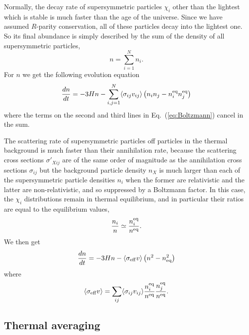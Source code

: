 Normally, the decay rate of supersymmetric particles $\chi_i$ other
than the lightest which is stable is much faster than the age of the
universe. Since we have assumed $R$-parity conservation, all of these
particles decay into the lightest one. So its final abundance is
simply described by the sum of the density of all supersymmetric
particles,
\begin{equation}
  n= \sum_{i=1}^N n_{i}.
\end{equation}
For $n$ we get the following evolution equation
\begin{equation}
  \frac{dn}{dt} = -3Hn - \sum_{i,j=1}^N \langle \sigma_{ij} v_{ij} \rangle 
  \left( n_{i}n_{j} - n_{i}^{\rm{eq}}n_{j}^{\rm{eq}} \right)
\end{equation}
where the terms on the second and third lines in
Eq.~(\ref{eq:Boltzmann}) cancel in the sum. 

The scattering rate of supersymmetric particles off particles in the
thermal background is much faster than their annihilation rate,
because the scattering cross sections $\sigma'_{Xij}$ are of the same
order of magnitude as the annihilation cross sections $\sigma_{ij}$
but the background particle density $n_X$ is much larger than each of
the supersymmetric particle densities $n_i$ when the former are
relativistic and the latter are non-relativistic, and so suppressed by
a Boltzmann factor. In this case, the $\chi_i$ distributions remain in
thermal equilibrium, and in particular their ratios are equal to the
equilibrium values,
\begin{equation}
  \frac{n_{i}}{n} \simeq \frac{n_{i}^{\rm{eq}}}{n^{\rm{eq}}}.
\end{equation}
We then get
\begin{equation} \label{eq:Boltzmann2}
  \frac{dn}{dt} =
  -3Hn - \langle \sigma_{\rm{eff}} v \rangle 
  \left( n^2 - n_{\rm{eq}}^2 \right)
\end{equation}
where
\begin{equation} \label{eq:sigmaveffdef}
  \langle \sigma_{\rm{eff}} v \rangle = \sum_{ij} \langle
  \sigma_{ij}v_{ij} \rangle \frac{n_{i}^{\rm{eq}}}{n^{\rm{eq}}}
  \frac{n_{j}^{\rm{eq}}}{n^{\rm{eq}}}.
\end{equation}


\subsection{Thermal averaging}
\label{sec:thermav}

